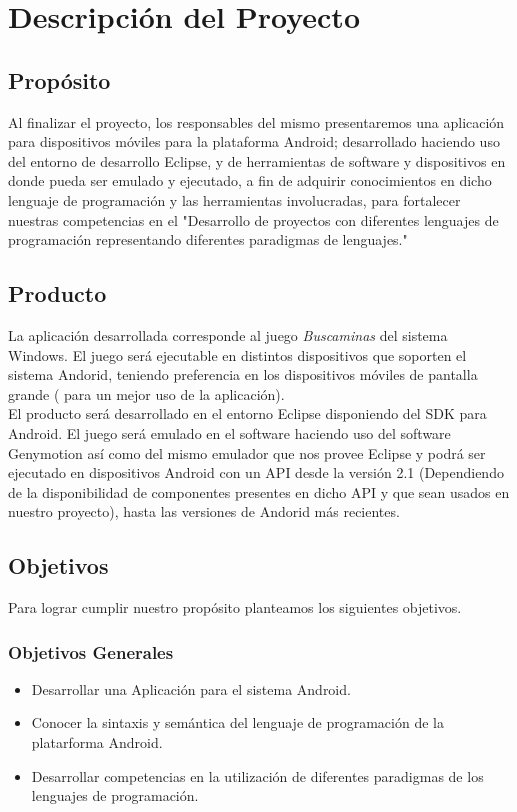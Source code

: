 \documentclass[11pt]{article} %
\begin{document}
\section{\textbf{Descripci\'on del Proyecto}}
\subsection{\textbf{Prop\'osito}}
Al finalizar el proyecto, los responsables del mismo presentaremos una aplicaci\'on para dispositivos m\'oviles para la plataforma Android; desarrollado haciendo uso del entorno de desarrollo Eclipse, y de herramientas de software y dispositivos en donde pueda ser emulado y ejecutado, a fin de adquirir conocimientos en dicho lenguaje de programaci\'on y las herramientas involucradas, para fortalecer nuestras competencias en el "Desarrollo de proyectos con diferentes lenguajes de programaci\'on representando diferentes paradigmas de lenguajes."
\subsection{\textbf{Producto}}
La aplicaci\'on desarrollada corresponde al juego \textsl{Buscaminas} del sistema Windows. El juego será ejecutable en distintos dispositivos que soporten el sistema Andorid, teniendo preferencia en los dispositivos m\'oviles de pantalla grande ( para un mejor uso de la aplicaci\'on).
\\El producto ser\'a desarrollado en el entorno Eclipse disponiendo del SDK para Android. El juego ser\'a emulado en el software haciendo uso del software Genymotion as\'i como del mismo emulador que nos provee Eclipse y podr\'a ser ejecutado en dispositivos Android con un API desde la versi\'on 2.1 (Dependiendo de la disponibilidad de componentes presentes en dicho API y que sean usados en nuestro proyecto), hasta las versiones de Andorid m\'as recientes.
\subsection{\textbf{Objetivos}}
Para lograr cumplir nuestro prop\'osito planteamos los siguientes objetivos.
\subsubsection{Objetivos Generales}
\begin{itemize}
\item Desarrollar una Aplicaci\'on para el sistema Android.
\item Conocer la sintaxis y sem\'antica del lenguaje de programaci\'on de la platarforma Android.
\item Desarrollar competencias en la utilizaci\'on de diferentes paradigmas de los lenguajes de programaci\'on.
\end{itemize}
\end{document}
